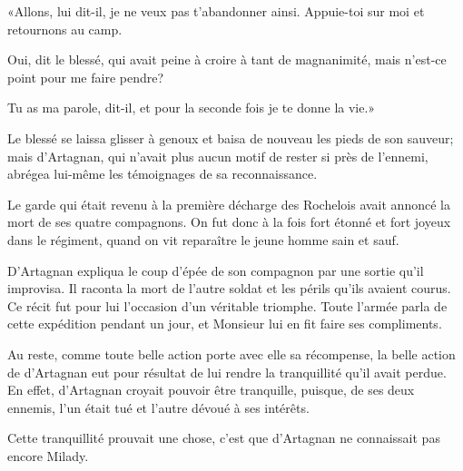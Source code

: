 «Allons, lui dit-il, je ne veux pas t'abandonner ainsi. Appuie-toi sur moi et retournons au camp. 

\speak  Oui, dit le blessé, qui avait peine à croire à tant de magnanimité, mais n'est-ce point pour me faire pendre? 

\speak  Tu as ma parole, dit-il, et pour la seconde fois je te donne la vie.» 

Le blessé se laissa glisser à genoux et baisa de nouveau les pieds de son sauveur; mais d'Artagnan, qui n'avait plus aucun motif de rester si près de l'ennemi, abrégea lui-même les témoignages de sa reconnaissance. 

Le garde qui était revenu à la première décharge des Rochelois avait annoncé la mort de ses quatre compagnons. On fut donc à la fois fort étonné et fort joyeux dans le régiment, quand on vit reparaître le jeune homme sain et sauf. 

D'Artagnan expliqua le coup d'épée de son compagnon par une sortie qu'il improvisa. Il raconta la mort de l'autre soldat et les périls qu'ils avaient courus. Ce récit fut pour lui l'occasion d'un véritable triomphe. Toute l'armée parla de cette expédition pendant un jour, et Monsieur lui en fit faire ses compliments. 

Au reste, comme toute belle action porte avec elle sa récompense, la belle action de d'Artagnan eut pour résultat de lui rendre la tranquillité qu'il avait perdue. En effet, d'Artagnan croyait pouvoir être tranquille, puisque, de ses deux ennemis, l'un était tué et l'autre dévoué à ses intérêts. 

Cette tranquillité prouvait une chose, c'est que d'Artagnan ne connaissait pas encore Milady.